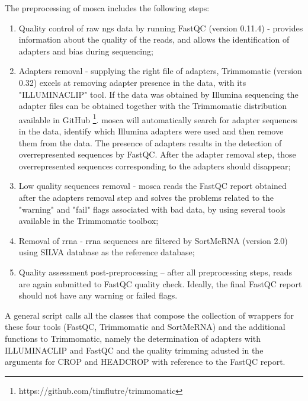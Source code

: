 \documentclass[
  oneside,
  11pt, a4paper,
  footinclude=true,
  headinclude=true,
  cleardoublepage=empty
]{scrbook}
\begin{document}
    The preprocessing of \gls{mosca} includes the following steps:
    \begin{enumerate}
        \item Quality control of raw \gls{ngs} data by running FastQC (version 0.11.4) - provides information about the quality of the reads, and allows the identification of adapters and bias during sequencing;
        
        \item Adapters removal - supplying the right file of adapters, Trimmomatic (version 0.32) excels at removing adapter presence in the data, with its "ILLUMINACLIP" tool. If the data was obtained by Illumina sequencing the adapter files can be obtained together with the Trimmomatic distribution available in GitHub \footnote{https://github.com/timflutre/trimmomatic}. \gls{mosca} will automatically search for adapter sequences in the data, identify which Illumina adapters were used and then remove them from the data. The presence of adapters results in the detection of overrepresented sequences by FastQC. After the adapter removal step, those overrepresented sequences corresponding to the adapters should disappear;
        
        \item Low quality sequences removal - \gls{mosca} reads the FastQC report obtained after the adapters removal step and solves the problems related to the "warning" and "fail" flags associated with bad data, by using several tools available in the Trimmomatic toolbox;
        
        \item Removal of \gls{rrna} - \gls{rrna} sequences are filtered by SortMeRNA (version 2.0) using SILVA database as the reference database;
        
        \item Quality assessment post-preprocessing – after all preprocessing steps, reads are again submitted to FastQC quality check. Ideally, the final FastQC report should not have any warning or failed flags.
    \end{enumerate}
    
    A general script calls all the classes that compose the collection of wrappers for these four tools (FastQC, Trimmomatic and SortMeRNA) and the additional functions to Trimmomatic, namely the determination of adapters with ILLUMINACLIP and FastQC and the quality trimming adusted in the arguments for CROP and HEADCROP with reference to the FastQC report.
    
\end{document}
